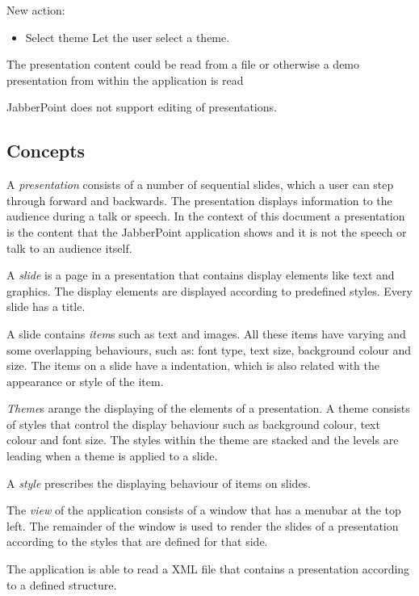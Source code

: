 \documentclass[a4paper]{article}
\begin{document}
New action:
\begin{itemize}
\item{Select theme} Let the user select a theme. 
\end{itemize}

The presentation content could be read from a file or otherwise a demo presentation from within the application is read

JabberPoint does not support editing of presentations.

\subsection{Concepts}

A \textit{presentation} consists of a number of sequential slides, which a user can step through forward and backwards. The presentation displays information to the audience during a talk or speech. In the context of this document a presentation is the content that the JabberPoint application shows and it is not the speech or talk to an audience itself.
 
A \textit{slide} is a page in a presentation that contains display elements like text and graphics. The display elements are displayed according to predefined styles. Every slide has a title.

A slide contains \textit{item}s such as text and images. All these items have varying and some overlapping  behaviours, such as: font type, text size, background colour and size. The items on a slide have a indentation, which is also related with the appearance or style of the item. 

\textit{Theme}s arange the displaying of the elements of a presentation. A theme consists of styles that control the display behaviour such as background colour, text colour and font size. The styles within the theme are stacked and the levels are leading when a theme is applied to a slide.  

A \textit{style} prescribes the displaying behaviour of items on slides. 

The \textit{view} of the application consists of a window that has a menubar at the top left. The remainder of the window is used to render the slides of a presentation according to the styles that are defined for that side.

The application is able to read a XML file that contains a presentation according to a defined structure.    
\end{document}
